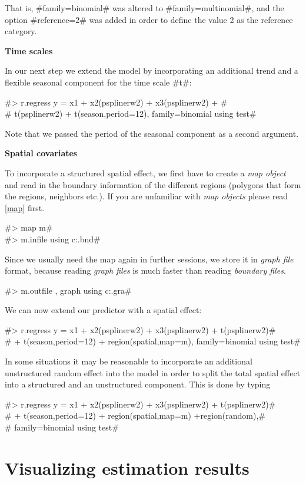 That is, #family=binomial# was altered to #family=multinomial#,
and the option #reference=2# was added in order to define the
value 2 as the reference category.

{\bf Time scales}
\medskip

In our next step we extend the model by incorporating an
additional trend and a flexible seasonal component for the time
scale #t#:

 #> r.regress y = x1 + x2(psplinerw2) + x3(psplinerw2) +  #\\
 #  t(psplinerw2) + t(season,period=12), family=binomial using test#

Note that we passed the period of the seasonal component as a
second argument.

{\bf Spatial covariates}
\medskip

To incorporate a structured spatial effect, we first have to
create a {\em map object} and read in the boundary information of
the different regions (polygons that form the regions, neighbors
etc.). If you are unfamiliar with {\em map objects} please read
\autoref{map} first.

#> map m# \\
#> m.infile using c:\maps\map.bnd#

Since we usually need the map again in further sessions, we store
it in {\em graph file} format, because reading {\em graph files}
is much faster than reading {\em boundary files}.

#> m.outfile , graph using c:\maps\mapgraph.gra#

We can now extend our predictor with a spatial effect:

 #> r.regress y = x1 + x2(psplinerw2) + x3(psplinerw2) + t(psplinerw2)#\\
 #  + t(season,period=12) + region(spatial,map=m), family=binomial using test#

In some situations it may be reasonable to incorporate  an
additional unstructured  random effect into the model in order to
split the total spatial effect into a structured and an
unstructured component. This is done by typing

#> r.regress y = x1 + x2(psplinerw2) + x3(psplinerw2) + t(psplinerw2)#\\
#  + t(season,period=12) + region(spatial,map=m) +region(random),#\\
#  family=binomial using test#

\section{Visualizing estimation results}
\label{remlregvisresults} 

